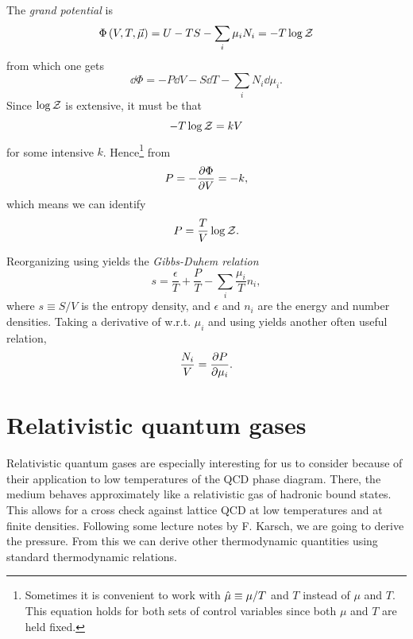 The {\it grand potential} is
\begin{equation}\label{eq:grand}
  \Phi\left(V,T,\vec{\mu}\right)=U-TS-\sum_i\mu_i N_i=-T\log\mathcal{Z}
\end{equation}
from which one gets
\begin{equation}\label{eq:1stlawgrand}
  \dd\Phi=-P\dd{V}-S\dd{T}-\sum_i N_i\dd\mu_i.
\end{equation}
Since $\log\mathcal{Z}$ is extensive, it must be that
\begin{equation}
-T\log\mathcal{Z}=kV
\end{equation}
for some intensive $k$. Hence\footnote{Sometimes it is convenient to work
with $\hat{\mu}\equiv\mu/T$ and $T$ instead of $\mu$ and $T$. This equation
holds for both sets of control variables since both $\mu$ and $T$ are
held fixed.} from 
\begin{equation}
P=-\pdv{\Phi}{V}=-k,
\end{equation}
which means we can identify
\begin{equation}\label{eq:pgrand}
P=\frac{T}{V}\log\mathcal{Z}.
\end{equation}

Reorganizing  using 
yields the {\it Gibbs-Duhem relation}
\begin{equation}
  s=\frac{\epsilon}{T}+\frac{P}{T}-\sum_i\frac{\mu_i}{T}n_i,
\end{equation}
where $s\equiv S/V$ is the entropy density, and $\epsilon$ and $n_i$
are the energy and number densities.
Taking a derivative of  w.r.t. $\mu_i$ and
using  yields
another often useful relation,
\begin{equation}
  \frac{N_i}{V}=\pdv{P}{\mu_i}.
\end{equation}

\section{Relativistic quantum gases}

Relativistic quantum gases are especially interesting for us
to consider because of their
application to low temperatures of the QCD phase diagram. There, the medium
behaves approximately like a relativistic gas of hadronic bound states.
This allows for a cross check against lattice QCD at low temperatures
and at finite densities. Following some lecture notes by F. Karsch,
we are going to derive the
pressure. From this we can derive other thermodynamic quantities
using standard thermodynamic relations.

